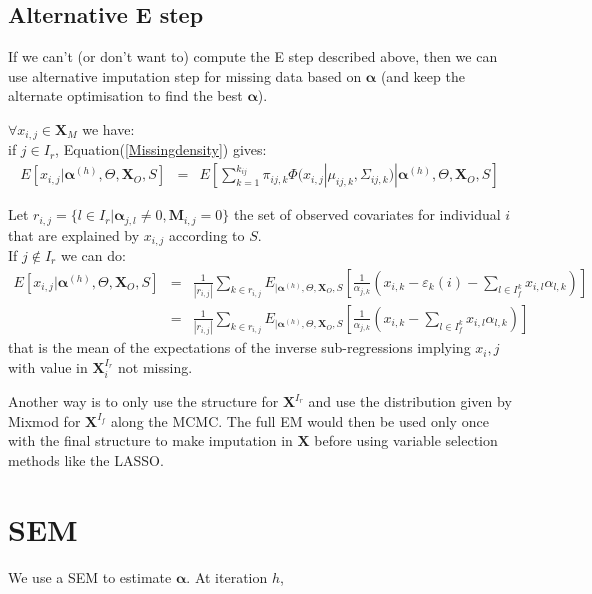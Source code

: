 \documentclass[11pt,a4paper]{report}
\begin{document}
		
\subsection{Alternative E step}
	If we can't (or don't want to) compute the E step described above, then we can use alternative imputation step for missing data based on $\boldsymbol{\alpha}$ (and keep the alternate optimisation to find the best $\boldsymbol{\alpha}$). 
	
	$\forall x_{i,j} \in \boldsymbol{X}_M $ we have:
	\\
if $j\in I_r$, Equation(\ref{Missingdensity}) gives: 
	\begin{eqnarray}
	E[x_{i,j}|\boldsymbol{\alpha}^{(h)},\Theta,\boldsymbol{X}_O,S]&=&E[\sum_{k=1}^{k_{ij}}\pi_{ij,k}\Phi(x_{i,j}|\mu_{ij,k},\Sigma_{ij,k})|\boldsymbol{\alpha}^{(h)},\Theta,\boldsymbol{X}_O,S] 
	\end{eqnarray}
	  
	Let $r_{i,j}=\{l \in I_r| \boldsymbol{\alpha}_{j,l}\neq 0, \boldsymbol{M}_{i,j}=0 \}$ the set of observed covariates for individual $i$ that are explained by $x_{i,j}$ according to $S$.
	\\
	If $j\notin I_r$ we can do:
	\begin{eqnarray}
	E[x_{i,j}|\boldsymbol{\alpha}^{(h)},\Theta,\boldsymbol{X}_O,S]&=&\frac{1}{|r_{i,j}|}\sum_{k \in r_{i,j}}E_{|\boldsymbol{\alpha}^{(h)},\Theta,\boldsymbol{X}_O,S}\left[\frac{1}{\alpha_{j,k}}\left(x_{i,k}-\varepsilon_{k}(i)-\sum_{l \in I_f^k} x_{i,l}\alpha_{l,k}\right)\right] \\
	&=& \frac{1}{|r_{i,j}|}\sum_{k \in r_{i,j}}E_{|\boldsymbol{\alpha}^{(h)},\Theta,\boldsymbol{X}_O,S}\left[\frac{1}{\alpha_{j,k}}\left(x_{i,k}- \sum_{l \in I_f^k} x_{i,l}\alpha_{l,k}\right)\right]
	\end{eqnarray}
	that is the mean of the expectations of the inverse sub-regressions implying $x_i,j$ with value in $\boldsymbol{X}^{I_r}_i$ not missing.



Another way is to only use the structure for $\boldsymbol{X}^{I_r}$ and use the distribution given by Mixmod for $\boldsymbol{X}^{I_f}$ along the MCMC. The full EM would then be used only once with the final structure to make imputation in $\boldsymbol{X}$ before using variable selection methods like the LASSO.

\section{SEM}
	We use a SEM \cite{celeux1986algorithme} to estimate $\boldsymbol{\alpha}$. At iteration $h$,
\end{document}
